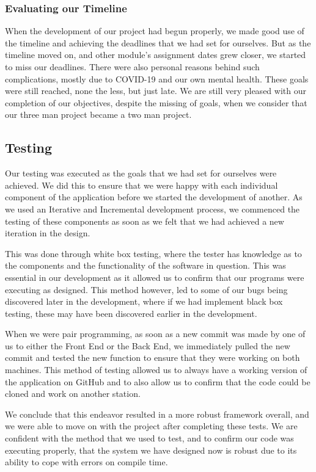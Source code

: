 \subsubsection{Evaluating our Timeline}
When the development of our project had begun properly, we made good use of the timeline and achieving the deadlines that we had set for ourselves. But as the timeline moved on, and other module's assignment dates grew closer, we started to miss our deadlines. There were also personal reasons behind such complications, mostly due to COVID-19 and our own mental health. These goals were still reached, none the less, but just late. We are still very pleased with our completion of our objectives, despite the missing of goals, when we consider that our three man project became a two man project.
\subsection{Testing}
Our testing was executed as the goals that we had set for ourselves were achieved. We did this to ensure that we were happy with each individual component of the application before we started the development of another. As we used an Iterative and Incremental development process, we commenced the testing of these components as soon as we felt that we had achieved a new iteration in the design.\par
This was done through white box testing, where the tester has knowledge as to the components and the functionality of the software in question. This was essential in our development as it allowed us to confirm that our programs were executing as designed. This method however, led to some of our bugs being discovered later in the development, where if we had implement black box testing, these may have been discovered earlier in the development. \par 
When we were pair programming, as soon as a new commit was made by one of us to either the Front End or the Back End, we immediately pulled the new commit and tested the new function to ensure that they were working on both machines. This method of testing allowed us to always have a working version of the application on GitHub and to also allow us to confirm that the code could be cloned and work on another station.\par
We conclude that this endeavor resulted in a more robust framework overall, and we were able to move on with the project after completing these tests. We are confident with the method that we used to test, and to confirm our code was executing properly, that the system we have designed now is robust due to its ability to cope with errors on compile time.


